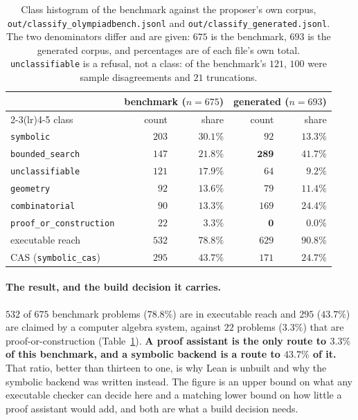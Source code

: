 \begin{table}[t]
\centering\small
\caption{Class histogram of the benchmark against the proposer's own corpus,
\texttt{out/classify\_olympiadbench.jsonl} and \texttt{out/classify\_generated.jsonl}. The two
denominators differ and are given: $675$ is the benchmark, $693$ is the generated corpus, and
percentages are of each file's own total. \texttt{unclassifiable} is a refusal, not a class:
of the benchmark's $121$, $100$ were sample disagreements and $21$ truncations.}
\label{tab:classmap}
\begin{tabular}{lrrrr}
\toprule
& \multicolumn{2}{c}{benchmark ($n{=}675$)} & \multicolumn{2}{c}{generated ($n{=}693$)} \\
\cmidrule(lr){2-3}\cmidrule(lr){4-5}
class & count & share & count & share \\
\midrule
\texttt{symbolic}              & $203$ & $30.1\%$ & $92$  & $13.3\%$ \\
\texttt{bounded\_search}       & $147$ & $21.8\%$ & $\mathbf{289}$ & $\mathbf{41.7\%}$ \\
\texttt{unclassifiable}        & $121$ & $17.9\%$ & $64$  & $9.2\%$ \\
\texttt{geometry}              & $92$  & $13.6\%$ & $79$  & $11.4\%$ \\
\texttt{combinatorial}         & $90$  & $13.3\%$ & $169$ & $24.4\%$ \\
\texttt{proof\_or\_construction} & $22$ & $\mathbf{3.3\%}$ & $\mathbf{0}$ & $\mathbf{0.0\%}$ \\
\midrule
executable reach               & $532$ & $\mathbf{78.8\%}$ & $629$ & $90.8\%$ \\
CAS (\texttt{symbolic\_cas})   & $295$ & $\mathbf{43.7\%}$ & $171$ & $24.7\%$ \\
\bottomrule
\end{tabular}
\end{table}

\paragraph{The result, and the build decision it carries.} $532$ of $675$ benchmark problems
($78.8\%$) are in executable reach and $295$ ($43.7\%$) are claimed by a computer algebra
system, against $22$ problems ($3.3\%$) that are proof-or-construction
(Table~\ref{tab:classmap}). \textbf{A proof assistant is the only route to $3.3\%$ of this
benchmark, and a symbolic backend is a route to $43.7\%$ of it.} That ratio, better than
thirteen to one, is why Lean is unbuilt and why the symbolic backend was written instead. The
figure is an upper bound on what any executable checker can decide here and a matching lower
bound on how little a proof assistant would add, and both are what a build decision needs.

